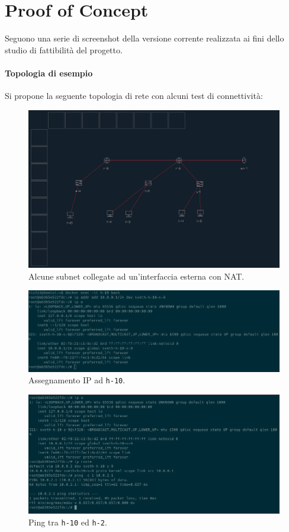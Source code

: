 \section{Proof of Concept}
Seguono una serie di screenshot della versione corrente realizzata ai fini dello studio di fattibilità del progetto.
\paragraph*{Topologia di esempio}
Si propone la seguente topologia di rete con alcuni test di connettività:
\newline\\
\begin{figure}[h!]
    \centering
    \includegraphics[width=14cm]{../images/poc_1.png}
    \caption[short]{Alcune subnet collegate ad un'interfaccia esterna con NAT.}
\end{figure}
\begin{figure}[h!]
    \centering
    \includegraphics[width=14cm]{../images/poc_2.png}
    \caption[short]{Assegnamento IP ad \texttt{h-10}.}
\end{figure}
\pagebreak
\begin{figure}[h!]
    \centering
    \includegraphics[width=14cm]{../images/poc_3.png}
    \caption[short]{Ping tra \texttt{h-10} ed \texttt{h-2}.}
\end{figure}
